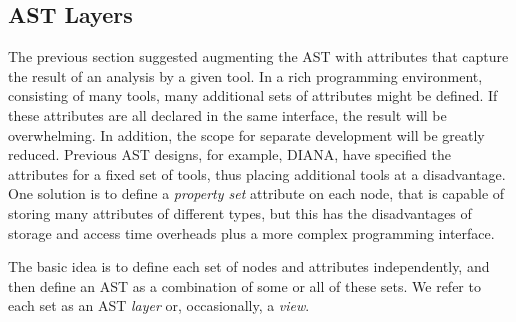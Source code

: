 {{\subsection{AST Layers}
\par
The previous section suggested augmenting the AST with attributes that
capture the result of an analysis by a given tool. In a rich
programming environment, consisting of many tools, many additional
sets of attributes might be defined. If these attributes are all
declared in the same interface, the result will be overwhelming. In
addition, the scope for separate development will be greatly reduced.
Previous AST designs, for example, DIANA, have specified the
attributes for a fixed set of tools, thus placing additional tools at
a disadvantage. One solution is to define a {\it property set}
attribute on each node, that is capable of storing many attributes of
different types, but this has the disadvantages of storage and access
time overheads plus a more complex programming interface.
\par
The basic idea is to define each set of nodes and attributes independently,
and then define an AST as a combination of some or all of these
sets. We refer to each set as an AST {\em layer} or, occasionally,
a {\em view}. 
\par
}}
